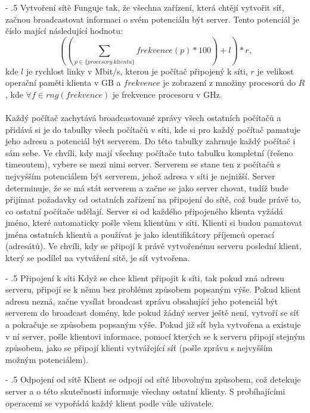 \documentclass[12pt]{article}
\makeatletter
\renewcommand\paragraph{%
    \@startsection{paragraph}{4}{0mm}%
       {-\baselineskip}%
       {.5\baselineskip}%
       {\normalfont\normalsize\bfseries}}
\makeatother
\begin{document}
\paragraph{Vytvoření sítě}
Funguje tak, že všechna zařízení, která chtějí vytvořit síť, začnou broadcastovat informaci o svém potenciálu být server. Tento potenciál je číslo mající následující hodnotu:
$$((\sum_{p \in \{procesory\ klienta\}} frekvence(p) * 100) + l) * r ,$$ 
kde $l$ je rychlost linky v Mbit/s, kterou je počítač připojený k síti, $r$ je velikost operační paměti klienta v GB a $frekvence$ je zobrazení z množiny procesorů do $R$, kde $\forall f \in rng(frekvence)$ je frekvence procesoru v GHz.\\\\
Každý počítač zachytává broadcastované zprávy všech ostatních počítačů a přidává si je do tabulky všech počítačů v síti, kde si pro každý počítač pamatuje jeho adresu a potenciál být serverem. Do této tabulky zahrnuje každý počítač i sám sebe. Ve chvíli, kdy mají všechny počítače tuto tabulku kompletní (řešeno timeoutem), vybere se mezi nimi server. Serverem se stane ten z počítačů s nejvyšším potenciálem být serverem, jehož adresa v síti je nejnižší. Server determinuje, že se má stát serverem a začne se jako server chovat, tudíž bude přijímat požadavky od ostatních zařízení na připojení do sítě, což bude právě to, co ostatní počítače udělají. Server si od každého připojeného klienta vyžádá jméno, které automaticky pošle všem klientům v síti. Klienti si budou pamatovat jména ostatních klientů a používat je jako identifikátory příjemců operací (adresátů). Ve chvíli, kdy se připojí k právě vytvořenému serveru poslední klient, který se podílel na vytváření sítě, je síť vytvořena.

\paragraph{Připojení k síti} 
Když se chce klient připojit k síti, tak pokud zná adresu serveru, připojí se k němu bez problému způsobem popsaným výše. Pokud klient adresu nezná, začne vysílat broadcast zprávu obsahující jeho potenciál být serverem do broadcast domény, kde pokud žádný server ještě není, vytvoří se síť a pokračuje se způsobem popsaným výše. Pokud již síť byla vytvořena a existuje v ní server, pošle klientovi informace, pomocí kterých se k serveru připojí stejným způsobem, jako se připojí klienti vytvářející síť (pošle zprávu s nejvyšším možným potenciálem).

\paragraph{Odpojení od sítě}
Klient se odpojí od sítě libovolným způsobem, což detekuje server a o této skutečnosti informuje všechny ostatní klienty. S probíhajícími operacemi se vypořádá každý klient podle vůle uživatele.
\end{document}
